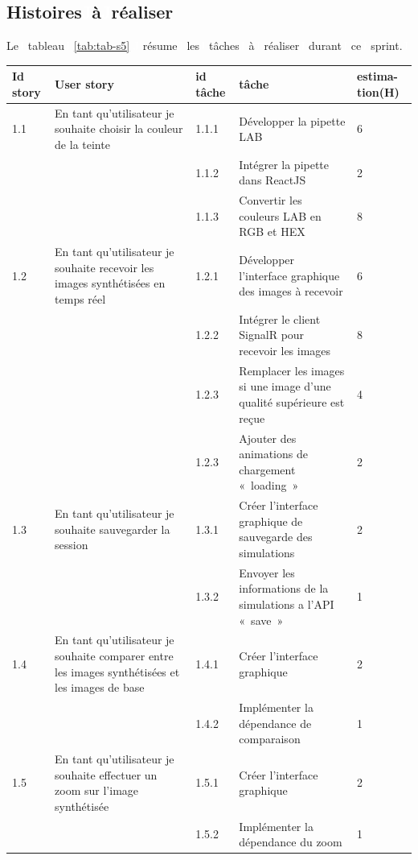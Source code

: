 \subsection{Histoires\textcolor{white}{J}\`a\textcolor{white}{J}r\'ealiser}
Le\textcolor{white}{J} tableau\textcolor{white}{J} \ref{tab:tab-s5} \textcolor{white}{J} résume\textcolor{white}{J} les\textcolor{white}{J} t\^aches\textcolor{white}{J} à\textcolor{white}{J} réaliser\textcolor{white}{J} durant\textcolor{white}{J} ce\textcolor{white}{J} sprint.\textcolor{white}{J} 
\begin{longtable}[!ht]{|m{1cm}|m{3cm}|m{1cm}|m{7cm}|m{1.3cm}|}
\hline
{\textbf{Id story}} & {\textbf{User story}} & {\textbf{id tâche}} & {\textbf{tâche}} & {\textbf{estima-tion(H)}}\\

\hline
1.1 & En tant qu’utilisateur je souhaite choisir la couleur de la teinte
  & 1.1.1 & Développer la pipette LAB & 6\\
\cline{3-5}
&& 1.1.2 & Intégrer la pipette dans ReactJS & 2\\
\cline{3-5}
&& 1.1.3 & Convertir les couleurs LAB en RGB et HEX & 8\\

\hline
1.2 & En tant qu’utilisateur je souhaite recevoir les images synthétisées en temps  réel  & 1.2.1 & Développer l’interface graphique des images à recevoir & 6\\
\cline{3-5}
&& 1.2.2 & Intégrer le client SignalR pour recevoir les images & 8\\
\cline{3-5}
&& 1.2.3 & Remplacer les images si une image d’une qualité supérieure est reçue  & 4\\
\cline{3-5}
&& 1.2.3 & Ajouter des animations de chargement « loading » & 2\\

\hline
1.3 & En tant qu’utilisateur je souhaite sauvegarder la session & 1.3.1 & Créer l’interface graphique de sauvegarde des simulations & 2\\
\cline{3-5}
&& 1.3.2 & Envoyer les informations de la simulations a l’API « save » & 1\\

\hline
1.4 & En tant qu’utilisateur je souhaite comparer entre les images synthétisées et les images de base & 1.4.1 & Créer l’interface graphique  & 2\\
\cline{3-5}
&& 1.4.2 & Implémenter la dépendance de comparaison & 1\\

\hline
1.5 & En tant qu’utilisateur je souhaite effectuer un zoom sur l’image synthétisée & 1.5.1 & Créer l’interface graphique & 2\\
\cline{3-5}
&& 1.5.2 & Implémenter la dépendance du zoom & 1\\


\end{longtable}
